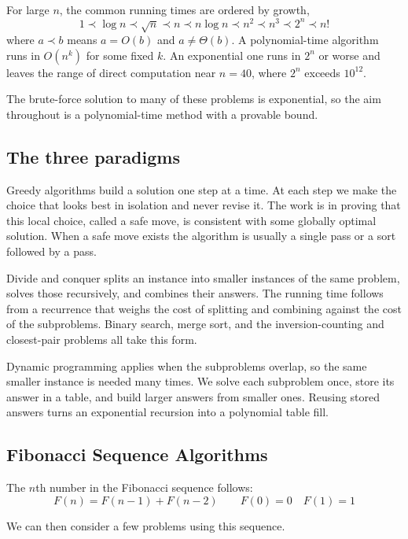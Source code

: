 \begin{keybox}
For large $n$, the common running times are ordered by growth,
\[
  1 \prec \log n \prec \sqrt{n} \prec n \prec n\log n \prec n^2 \prec n^3 \prec 2^n \prec n!
\]
where $a \prec b$ means $a = O(b)$ and $a \ne \Theta(b)$. A polynomial-time algorithm runs in $O(n^k)$ for some fixed $k$. An exponential one runs in $2^n$ or worse and leaves the range of direct computation near $n = 40$, where $2^n$ exceeds $10^{12}$.
\end{keybox}

The brute-force solution to many of these problems is exponential, so the aim throughout is a polynomial-time method with a provable bound.

\subsection*{The three paradigms}

Greedy algorithms build a solution one step at a time. At each step we make the choice that looks best in isolation and never revise it. The work is in proving that this local choice, called a safe move, is consistent with some globally optimal solution. When a safe move exists the algorithm is usually a single pass or a sort followed by a pass.

Divide and conquer splits an instance into smaller instances of the same problem, solves those recursively, and combines their answers. The running time follows from a recurrence that weighs the cost of splitting and combining against the cost of the subproblems. Binary search, merge sort, and the inversion-counting and closest-pair problems all take this form.

Dynamic programming applies when the subproblems overlap, so the same smaller instance is needed many times. We solve each subproblem once, store its answer in a table, and build larger answers from smaller ones. Reusing stored answers turns an exponential recursion into a polynomial table fill.

\subsection{Fibonacci Sequence Algorithms}

\medskip

The $n$th number in the Fibonacci sequence follows:
\[
F(n) = F(n-1) + F(n-2) \qquad F(0) = 0 \quad F(1) = 1
\]

We can then consider a few problems using this sequence.



